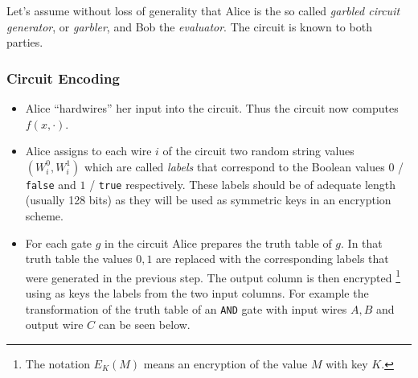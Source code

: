 Let's assume without loss of generality that Alice is the so called \textit{garbled circuit generator}, or \textit{garbler}, and Bob the \textit{evaluator}. The circuit is known to both parties.

\subsubsection{Circuit Encoding}

\begin{itemize}
  \item Alice ``hardwires'' her input into the circuit. Thus the circuit now computes $f(x, \cdot)$.
  \item Alice assigns to each wire $i$ of the circuit two random string values $(W_i^0, W_i^1)$ which are called \textit{labels} that correspond to the Boolean values $0$ / \texttt{false} and $1$ / \texttt{true} respectively. These labels should be of adequate length (usually 128 bits) as they will be used as symmetric keys in an encryption scheme.
  \item For each gate $g$ in the circuit Alice prepares the truth table of $g$. In that truth table the values $0,1$ are replaced with the corresponding labels that were generated in the previous step. The output column is then encrypted \footnote{The notation $E_{K}(M)$ means an encryption of the value $M$ with key $K$.} using as keys the labels from the two input columns.
  For example the transformation of the truth table of an \texttt{AND} gate with input wires $A,B$ and output wire $C$ can be seen below.


\end{itemize}
